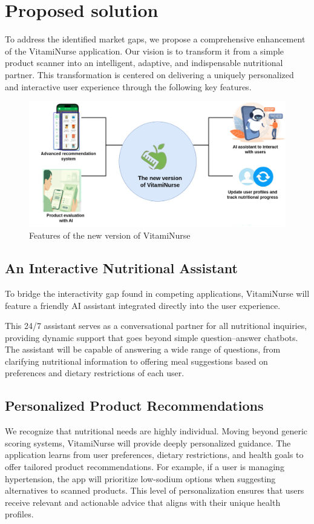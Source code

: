  
\section{Proposed solution}
  
To address the identified market gaps, we propose a comprehensive
enhancement of the VitamiNurse application. Our vision is to transform it from a simple product scanner into an intelligent, adaptive, and
indispensable nutritional partner. This transformation is centered on delivering a uniquely personalized and interactive user experience through
the following key features.

\begin{figure}[H]
\centering
\includegraphics[scale=0.45]{images/new_version_VN.png}
\caption{Features of the new version of VitamiNurse}
\label{fig:VN_new_features}
\end{figure}



\subsection{An Interactive Nutritional Assistant}

To bridge the interactivity gap found in competing applications, VitamiNurse will feature a friendly AI assistant integrated directly into the
user experience.
\par This 24/7 assistant serves as a conversational partner
for all nutritional inquiries, providing dynamic support that goes beyond
simple question–answer chatbots.
The assistant will be capable of answering a wide range of questions,
from clarifying nutritional information to offering meal suggestions based
on preferences and dietary restrictions of each user.

\subsection{Personalized Product Recommendations}
We recognize that nutritional needs are highly individual. Moving beyond
generic scoring systems, VitamiNurse will provide deeply personalized
guidance. The application learns from user preferences, dietary restrictions, and health goals to offer tailored product recommendations.
For example, if a user is managing hypertension, the app will prioritize low-sodium options when suggesting alternatives to scanned products. 
This level of personalization ensures that users receive relevant and actionable advice that aligns with their unique health profiles.

